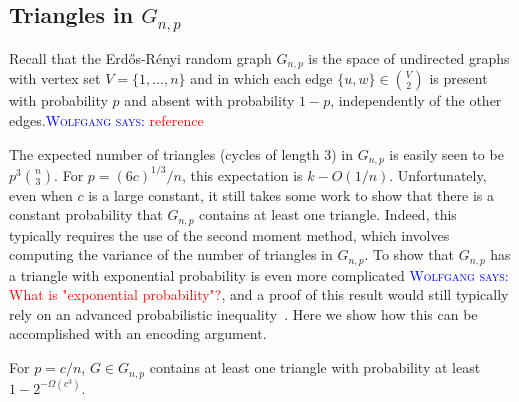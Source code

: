 \documentclass{patmorin}
\newcommand{\aremark}[3]{\textcolor{blue}{\textsc{#1 #2:}}
  \textcolor{red}{\textsf{#3}}}
\newcommand{\wolfgang}[2][says]{\aremark{Wolfgang}{#1}{#2}}
\begin{document}
\subsection{Triangles in $G_{n,p}$}

Recall that the Erd\H{o}s-R\'{e}nyi random graph $G_{n,p}$ is the
space of undirected graphs with vertex set $V=\{1,\ldots,n\}$ and in
which each edge $\{u, w\} \in \binom{V}{2}$ is present with
probability $p$ and absent with probability $1-p$, independently of
the other edges.\wolfgang{reference}

The expected number of triangles (cycles of length 3) in $G_{n,p}$ is
easily seen to be $p^3\binom{n}{3}$.  For $p=(6c)^{1/3}/n$, this
expectation is $k-O(1/n)$.  Unfortunately, even when $c$ is a large
constant, it still takes some work to show that there is a constant
probability that $G_{n,p}$ contains at least one triangle. Indeed,
this typically requires the use of the second moment method, which
involves computing the variance of the number of triangles in
$G_{n,p}$. To show that $G_{n, p}$ has a triangle with exponential
probability is even more complicated 
\wolfgang{What is "exponential probability"?}, and a proof of this result would
still typically rely on an advanced probabilistic
inequality~\cite{alon:probabilistic}. Here we show how this can be
accomplished with an encoding argument.

\begin{thm}
  For $p=c/n$, $G \in G_{n,p}$ contains at least one triangle with
  probability at least $1-2^{-\Omega(c^3)}$.
\end{thm}
\end{document}

